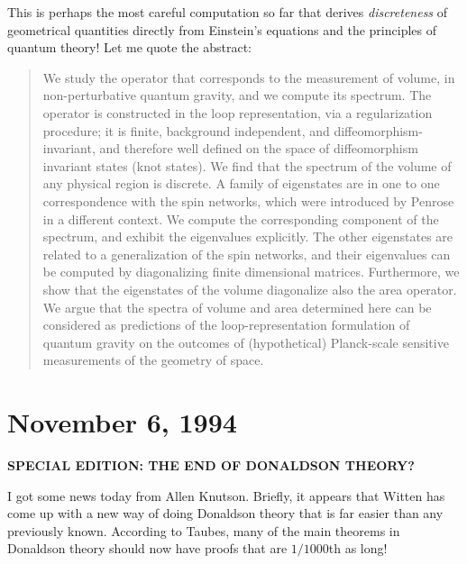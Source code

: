 \documentclass{article}
\def\tightlist{}
\renewcommand{\texttt}[1]{%
  \begingroup
  \ttfamily
  \begingroup\lccode`~=`/\lowercase{\endgroup\def~}{/\discretionary{}{}{}}%
  \begingroup\lccode`~=`[\lowercase{\endgroup\def~}{[\discretionary{}{}{}}%
  \begingroup\lccode`~=`.\lowercase{\endgroup\def~}{.\discretionary{}{}{}}%
  \catcode`/=\active\catcode`[=\active\catcode`.=\active
  \scantokens{#1\noexpand}%
  \endgroup
}
\begin{document}
\noindent
This is perhaps the most careful computation so far that derives
\emph{discreteness} of geometrical quantities directly from Einstein's
equations and the principles of quantum theory! Let me quote the
abstract:

\begin{quote}
We study the operator that corresponds to the measurement of volume, in
non-perturbative quantum gravity, and we compute its spectrum. The
operator is constructed in the loop representation, via a regularization
procedure; it is finite, background independent, and
diffeomorphism-invariant, and therefore well defined on the space of
diffeomorphism invariant states (knot states). We find that the spectrum
of the volume of any physical region is discrete. A family of
eigenstates are in one to one correspondence with the spin networks,
which were introduced by Penrose in a different context. We compute the
corresponding component of the spectrum, and exhibit the eigenvalues
explicitly. The other eigenstates are related to a generalization of the
spin networks, and their eigenvalues can be computed by diagonalizing
finite dimensional matrices. Furthermore, we show that the eigenstates
of the volume diagonalize also the area operator. We argue that the
spectra of volume and area determined here can be considered as
predictions of the loop-representation formulation of quantum gravity on
the outcomes of (hypothetical) Planck-scale sensitive measurements of
the geometry of space.
\end{quote}



\hypertarget{week44}{%
\section{November 6, 1994}\label{week44}}

\begin{center}
\textbf{SPECIAL EDITION: THE END OF DONALDSON THEORY?}
\end{center}

I got some news today from Allen Knutson. Briefly, it appears that
Witten has come up with a new way of doing Donaldson theory that is far
easier than any previously known. According to Taubes, many of the main
theorems in Donaldson theory should now have proofs that are
\(1/1000\)th as long!
\end{document}
